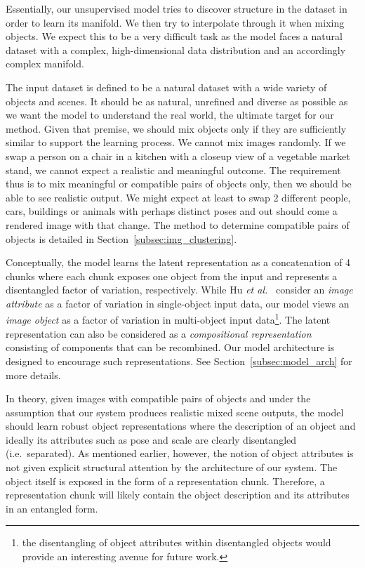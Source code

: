 \documentclass[a4paper,12pt]{report}
\begin{document}
Essentially, our unsupervised model tries to discover structure in the dataset in order to learn its manifold. We then try to interpolate through it when mixing objects. We expect this to be a very difficult task as the model faces a natural dataset with a complex, high-dimensional data distribution and an accordingly complex manifold. 

The input dataset is defined to be a natural dataset with a wide variety of objects and scenes. It should be as natural, unrefined and diverse as possible as we want the model to understand the real world, the ultimate target for our method. Given that premise, we should mix objects only if they are sufficiently similar to support the learning process. We cannot mix images randomly. If we swap a person on a chair in a kitchen with a closeup view of a vegetable market stand, we cannot expect a realistic and meaningful outcome. The requirement thus is to mix meaningful or compatible pairs of objects only, then we should be able to see realistic output. We might expect at least to swap 2 different people, cars, buildings or animals with perhaps distinct poses and out should come a rendered image with that change. The method to determine compatible pairs of objects is detailed in Section~\ref{subsec:img_clustering}. 

Conceptually, the model learns the latent representation as a concatenation of 4 chunks where each chunk exposes one object from the input and represents a disentangled factor of variation, respectively. While Hu \textit{et al.}~\cite{DisentFacOfVarByMixTh} consider an \textit{image attribute} as a factor of variation in single-object input data, our model views an \textit{image object} as a factor of variation in multi-object input data\footnote{the disentangling of object attributes within disentangled objects would provide an interesting avenue for future work.}. The latent representation can also be considered as a \textit{compositional representation}~\cite{SpatialBDecoder} consisting of components that can be recombined. %
Our model architecture is designed to encourage such representations. See Section~\ref{subsec:model_arch} for more details. 

In theory, given images with compatible pairs of objects and under the assumption that our system produces realistic mixed scene outputs, the model should learn robust object representations where the description of an object and ideally its attributes such as pose and scale are clearly disentangled (i.e.\ separated). As mentioned earlier, however, the notion of object attributes is not given explicit structural attention by the architecture of our system. The object itself is exposed in the form of a representation chunk. Therefore, a representation chunk will likely contain the object description and its attributes in an entangled form.
\end{document}
